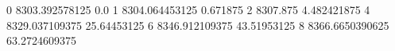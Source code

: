 0 8303.392578125 0.0
1 8304.064453125 0.671875
2 8307.875 4.482421875
4 8329.037109375 25.64453125
6 8346.912109375 43.51953125
8 8366.6650390625 63.2724609375
